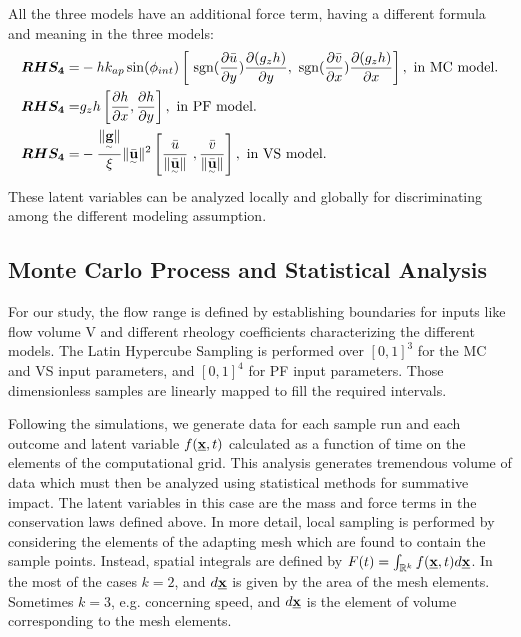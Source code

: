 \documentclass{article}
\begin{document}
All the three models have an additional force term, having a different formula and meaning in the three models:
\begin{align}
\boldsymbol{RHS_4} =&  - h k_{ap}\sin(\phi_{int})\left[ \ {\rm sgn}(\frac{\partial \bar{u}}{\partial y}) \frac{\partial (g_z h)}{\partial y},\ {\rm sgn}({\frac{\partial \bar{v}}{\partial x}}) \frac{\partial (g_z h)}{\partial x}\right],\textmd{ in MC model.}\nonumber\\
\boldsymbol{RHS_4} =& g_{z}h\left[\frac{\partial h}{\partial x}, \frac{\partial h}{\partial y}\right],\textmd{ in PF model.}\\
\boldsymbol{RHS_4} =& -\frac{\| \underset{^\sim}{\textbf g} \|}{\xi}\| \underset{^\sim}{\bar{\textbf u}} \|^2\left[\frac{\bar{u}}{\| \underset{^\sim}{\bar{\textbf u}}\|} \ ,\frac{\bar{v}}{\| \underset{^\sim}{\bar{\textbf u}}\|}\right],\textmd{ in VS model.}\nonumber
\end{align}
These latent variables can be analyzed locally and globally for discriminating among the different modeling assumption.

\subsection{Monte Carlo Process and Statistical Analysis}
For our study, the flow range is defined by establishing boundaries for inputs like flow volume V and different rheology coefficients characterizing the different models. The Latin Hypercube Sampling is performed over $[0,1]^3$ for the MC and VS input parameters, and $[0,1]^4$ for PF input parameters. Those dimensionless samples are linearly  mapped to fill the required intervals.

Following the simulations, we generate data for each sample run and each outcome and latent variable $f(\underline{\textbf x},t)$ calculated as a function of time on the elements of the computational grid. This analysis generates tremendous volume of data which must then be analyzed using statistical methods for summative impact. The latent variables in this case are the mass and force terms in the conservation laws defined above. In more detail, local sampling is performed by considering the elements of the adapting mesh which are found to contain the sample points. Instead, spatial integrals are defined by $F(t)=\int_{\mathbb R^k}f(\underline{\textbf x},t) d\underline{\textbf x}$. In the most of the cases $k=2$, and $d\underline{\textbf x}$ is given by the area of the mesh elements. Sometimes $k=3$, e.g. concerning speed, and $d\underline{\textbf x}$ is the element of volume corresponding to the mesh elements.
\end{document}
